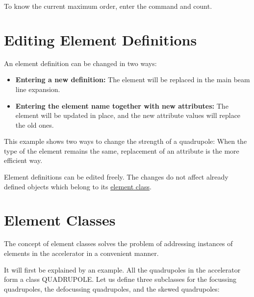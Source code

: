 To know the current maximum order, enter the command 
 and count. 


%
\section{Editing Element Definitions}  
\label{sec:element_editing}

An element definition can be changed in two ways: 
\begin{itemize}
   \item \textbf{Entering a new definition:} The element will be
     replaced in the main beam line expansion.  
   \item \textbf{Entering the element name together with new
     attributes:} The element will be updated in place, and the new
     attribute values will replace the old ones.  
\end{itemize} 

This example shows two ways to change the strength of a quadrupole: 
When the type of the element remains the same, replacement of an
attribute is the more efficient way.  

Element definitions can be edited freely. The changes do not affect
already defined objects which belong to its
\href{elm_class.html}{element class}.  



%
\section{Element Classes}  
\label{sec:element_classes}
The concept of element classes solves the problem of addressing
instances of elements in the accelerator in a convenient manner. 

It will first be explained by an example. All the quadrupoles in the
accelerator form a class QUADRUPOLE. Let us define three subclasses for the
focussing quadrupoles, the defocussing quadrupoles, and the skewed
quadrupoles:  

